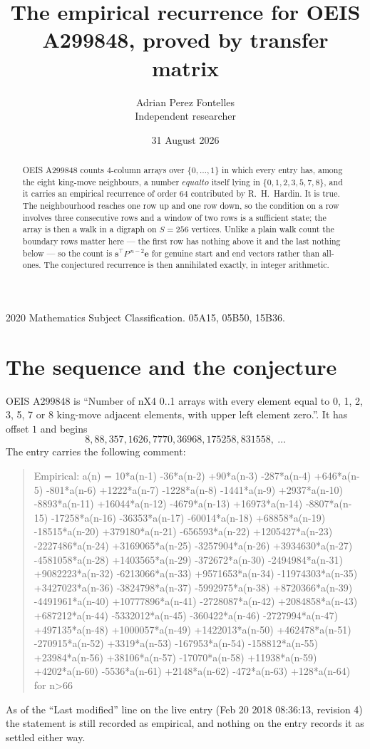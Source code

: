 \documentclass[11pt,a4paper]{article}
\title{The empirical recurrence for OEIS A299848, proved by transfer matrix}
\author{Adrian Perez Fontelles\\ \small Independent researcher}
\date{31 August 2026}
\theoremstyle{plain}
\theoremstyle{definition}
\begin{document}
\maketitle

\begin{abstract}
OEIS A299848 counts $4$-column arrays over $\{0,\dots,1\}$ in which every entry has,
among the eight king-move neighbours, a number $equal to$ itself lying in $\{0,1,2,3,5,7,8\}$, and it carries an empirical
recurrence of order $64$ contributed by R.~H.~Hardin. It is true. The neighbourhood
reaches one row up and one row down, so the condition on a row involves three consecutive
rows and a window of two rows is a sufficient state; the array is then a walk in a digraph
on $S=256$ vertices. Unlike a plain walk count the boundary rows matter here --- the first
row has nothing above it and the last nothing below --- so the count is
$\mathbf{s}^{\!\top}P^{\,n-2}\mathbf{e}$ for genuine start and end vectors rather than
all-ones. The conjectured recurrence is then annihilated exactly, in integer arithmetic.
\end{abstract}

\noindent\small 2020 Mathematics Subject Classification. 05A15, 05B50, 15B36.\normalsize

\section{The sequence and the conjecture}

OEIS A299848 is ``Number of nX4 0..1 arrays with every element equal to 0, 1, 2, 3, 5, 7 or 8 king-move adjacent elements, with upper left element zero.''. It has offset
$1$ and begins
\[
8, 88, 357, 1626, 7770, 36968, 175258, 831558,\ \dots
\]
The entry carries the following comment:
\begin{quote}\small
Empirical: a(n) = 10*a(n-1) -36*a(n-2) +90*a(n-3) -287*a(n-4) +646*a(n-5) -801*a(n-6) +1222*a(n-7) -1228*a(n-8) -1441*a(n-9) +2937*a(n-10) -8893*a(n-11) +16044*a(n-12) -4679*a(n-13) +16973*a(n-14) -8807*a(n-15) -17258*a(n-16) -36353*a(n-17) -60014*a(n-18) +68858*a(n-19) -18515*a(n-20) +379180*a(n-21) -656593*a(n-22) +1205427*a(n-23) -2227486*a(n-24) +3169065*a(n-25) -3257904*a(n-26) +3934630*a(n-27) -4581058*a(n-28) +1403565*a(n-29) -372672*a(n-30) -2494984*a(n-31) +9082223*a(n-32) -6213066*a(n-33) +9571653*a(n-34) -11974303*a(n-35) +3427023*a(n-36) -3824798*a(n-37) -5992975*a(n-38) +8720366*a(n-39) -4491961*a(n-40) +10777896*a(n-41) -2728087*a(n-42) +2084858*a(n-43) +687212*a(n-44) -5332012*a(n-45) -360422*a(n-46) -2727994*a(n-47) +497135*a(n-48) +1000057*a(n-49) +1422013*a(n-50) +462478*a(n-51) -270915*a(n-52) +3319*a(n-53) -167953*a(n-54) -158812*a(n-55) +23984*a(n-56) +38106*a(n-57) -17070*a(n-58) +11938*a(n-59) +4202*a(n-60) -5536*a(n-61) +2148*a(n-62) -472*a(n-63) +128*a(n-64) for n>66
\end{quote}
As of the ``Last modified'' line on the live entry (Feb 20 2018 08:36:13, revision
4) the statement is still recorded as empirical, and nothing on the entry
records it as settled either way.
\end{document}
